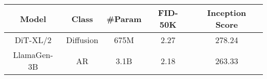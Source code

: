 \begin{table}[!ht]
    \centering
    \begin{tabular}{ccccc}
        \toprule
        Model & Class & \#Param & FID-50K & Inception Score \\
        \midrule
        DiT-XL/2 & Diffusion & 675M & 2.27 & 278.24 \\
        LlamaGen-3B & AR & 3.1B & 2.18 & 263.33 \\
        \bottomrule
    \end{tabular}
\end{table}